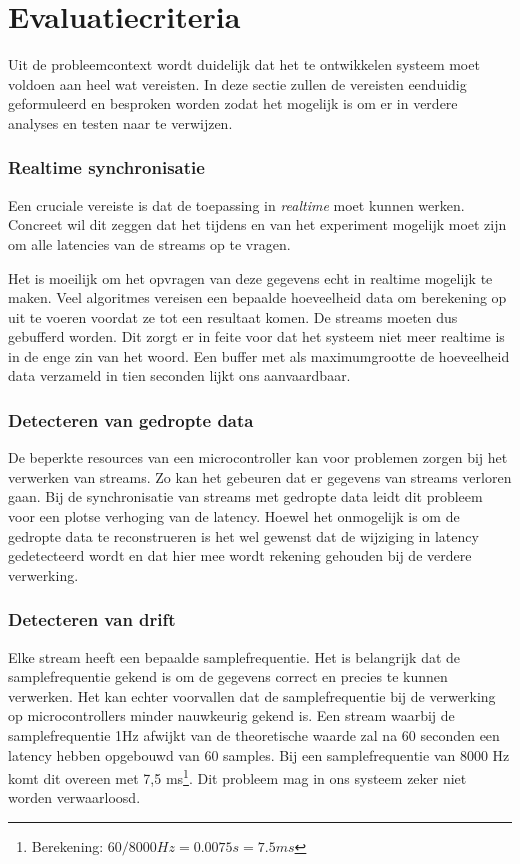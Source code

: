 \section{Evaluatiecriteria}
\label{evaluatie-criteria}

Uit de probleemcontext wordt duidelijk dat het te ontwikkelen systeem moet voldoen aan heel wat vereisten. In deze sectie zullen de vereisten eenduidig geformuleerd en besproken worden zodat het mogelijk is om er in verdere analyses en testen naar te verwijzen.  

\subsubsection{Realtime synchronisatie}

Een cruciale vereiste is dat de toepassing in \textit{realtime} moet kunnen werken. Concreet wil dit zeggen dat het tijdens en van het experiment mogelijk moet zijn om alle latencies van de streams op te vragen. 

Het is moeilijk om het opvragen van deze gegevens echt in realtime mogelijk te maken. Veel algoritmes vereisen een bepaalde hoeveelheid data om berekening op uit te voeren voordat ze tot een resultaat komen. De streams moeten dus gebufferd worden. Dit zorgt er in feite voor dat het systeem niet meer realtime is in de enge zin van het woord. Een buffer met als maximumgrootte de hoeveelheid data verzameld in tien seconden lijkt ons aanvaardbaar.

\subsubsection{Detecteren van gedropte data}

De beperkte resources van een microcontroller kan voor problemen zorgen bij het verwerken van streams. Zo kan het gebeuren dat er gegevens van streams verloren gaan. Bij de synchronisatie van streams met gedropte data leidt dit probleem voor een plotse verhoging van de latency. Hoewel het onmogelijk is om de gedropte data te reconstrueren is het wel gewenst dat de wijziging in latency gedetecteerd wordt en dat hier mee wordt rekening gehouden bij de verdere verwerking.

\subsubsection{Detecteren van drift}

Elke stream heeft een bepaalde samplefrequentie. Het is belangrijk dat de samplefrequentie gekend is om de gegevens correct en precies te kunnen verwerken. Het kan echter voorvallen dat de samplefrequentie bij de verwerking op microcontrollers minder nauwkeurig gekend is. Een stream waarbij de samplefrequentie 1Hz afwijkt van de theoretische waarde zal na 60 seconden een latency hebben opgebouwd van 60 samples. Bij een samplefrequentie van 8000 Hz komt dit overeen met 7,5 ms\footnote{Berekening: $ 60 / 8000 Hz = 0.0075 s = 7.5 ms $}. Dit probleem mag in ons systeem zeker niet worden verwaarloosd. 

